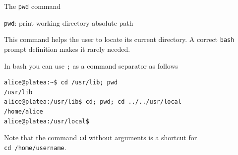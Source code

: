 \begin{frame}[fragile]{The \texttt{pwd} command}
  
  \begin{block}{ \alert{\texttt{pwd}}: print working directory absolute path}
    
      {\footnotesize  This command helps the user to locate its current directory. A correct \texttt{bash} prompt definition makes it rarely needed.

      In bash you can use \alert{\texttt{;}} as a command separator as follows}
      
    {\scriptsize
      \begin{lstlisting}
alice@platea:~$ cd /usr/lib; pwd
/usr/lib
alice@platea:/usr/lib$ cd; pwd; cd ../../usr/local
/home/alice
alice@platea:/usr/local$ 
      \end{lstlisting}

    }

    {\footnotesize
Note that the command \texttt{cd} without arguments is a shortcut for
\\
\texttt{cd /home/username}.
}

\end{block}


\end{frame}

